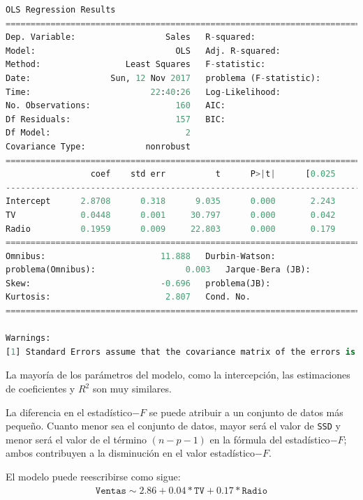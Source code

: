 \begin{lstlisting}[language=Python]
                            OLS Regression Results
==============================================================================
Dep. Variable:                  Sales   R-squared:                       0.906
Model:                            OLS   Adj. R-squared:                  0.904
Method:                 Least Squares   F-statistic:                     753.7
Date:                Sun, 12 Nov 2017   problema (F-statistic):           3.22e-81
Time:                        22:40:26   Log-Likelihood:                -299.60
No. Observations:                 160   AIC:                             605.2
Df Residuals:                     157   BIC:                             614.4
Df Model:                           2
Covariance Type:            nonrobust
==============================================================================
                 coef    std err          t      P>|t|      [0.025      0.975]
------------------------------------------------------------------------------
Intercept      2.8708      0.318      9.035      0.000       2.243       3.498
TV             0.0448      0.001     30.797      0.000       0.042       0.048
Radio          0.1959      0.009     22.803      0.000       0.179       0.213
==============================================================================
Omnibus:                       11.888   Durbin-Watson:                   2.158
problema(Omnibus):                  0.003   Jarque-Bera (JB):               13.175
Skew:                          -0.696   problema(JB):                      0.00138
Kurtosis:                       2.807   Cond. No.                         438.
==============================================================================

Warnings:
[1] Standard Errors assume that the covariance matrix of the errors is correctly specified.
\end{lstlisting}


La mayoría de los parámetros del modelo, como la intercepción, las estimaciones de coeficientes y $R^2$ son
muy similares.


La diferencia en el estadístico$-F$ se puede atribuir a un conjunto de datos más pequeño. Cuanto menor sea el conjunto de datos, mayor será el valor de \texttt{SSD} y menor será el valor de
el término $(n-p-1)$ en la fórmula del estadístico$-F$; ambos contribuyen a la disminución en el valor estadístico$-F.$


El modelo puede reescribirse como sigue:
\begin{align}
 \texttt{Ventas} \sim 2.86 + 0.04*\texttt{TV} + 0.17*\texttt{Radio}
\end{align}

